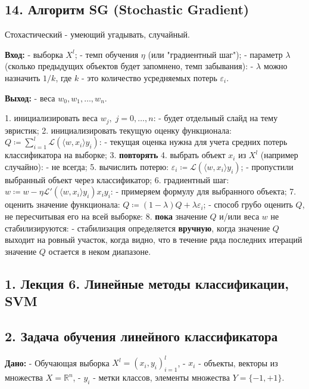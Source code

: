 \subsection{14. Алгоритм SG (Stochastic Gradient)}

Стохастический - умеющий угадывать, случайный.

\textbf{Вход:}
- выборка $X^l$;
- темп обучения $\eta$ (или "градиентный шаг");
- параметр $\lambda$ (сколько предыдущих объектов будет запомнено,
темп забывания):
    - $\lambda$ можно назначить $1/k$, где $k$ - это количество
    усредняемых потерь $\varepsilon_i$.

\textbf{Выход:}
- веса $w_0, w_1, \ldots, w_n$.

1. инициализировать веса $w_j, \; j = 0, \ldots, n$:
    - будет отдельный слайд на тему эвристик;
2. инициализировать текущую оценку функционала:\
$Q \coloneqq \sum_{i=1}^{l}{\mathscr{L}{\left( {\langle w, x_i \rangle} y_i \right)}}$:
    - текущая оценка нужна для учета средних потерь классификатора на
    выборке;
3. \textbf{повторять}
4. выбрать объект $x_i$ из $X^l$ (например случайно):
    - не всегда;
5. вычислить потерю:
$\varepsilon_{i} \coloneqq \mathscr{L}{\left( {\langle w, x_i \rangle} y_i \right)}$;
    - пропустили выбранный объект через классификатор;
6. градиентный шаг:
$w \coloneqq w - \eta \mathscr{L}'{\left( {\langle w, x_i \rangle} y_i \right)} x_i y_i$:
    - примеряем формулу для выбранного объекта;
7. оценить значение функционала:
$Q \coloneqq {\left( 1 - \lambda \right)} Q + \lambda \varepsilon_i$;
    - способ грубо оценить $Q$, не пересчитывая его на всей выборке:
8. \textbf{пока} значение $Q$ и/или веса $w$ не стабилизируются:
    - стабилизация определяется \textbf{вручную}, когда значение $Q$ выходит на
    ровный участок, когда видно, что в течение ряда последних итераций
    значение $Q$ остается в неком диапазоне.

\subsection{1. Лекция 6. Линейные методы классификации, SVM}

\subsection{2. Задача обучения линейного классификатора}

\textbf{Дано:}
- Обучающая выборка $X^l = {(x_i, y_i)}^l_{i=1}$,
- $x_i$ - объекты, векторы из множества $X = \mathbb{R}^n$,
- $y_i$ - метки классов, элементы множества $Y = {\lbrace -1, +1\rbrace}$.

